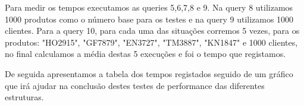\begin{verbatim}

\end{verbatim}

\par Para medir os tempos executamos as queries 5,6,7,8 e 9. Na query 8 utilizamos 1000 produtos como o número base
para os testes e na query 9 utilizamos 1000 clientes. Para a query 10, para cada uma das situações corremos 5 vezes,
para os produtos: "HO2915", "GF7879", "EN3727", "TM3887", "KN1847" e 1000 clientes, no final calculamos a média destas 5
execuções e foi o tempo que registamos.
\par De seguida apresentamos a tabela dos tempos registados seguido de um gráfico que irá ajudar na conclusão destes
testes de performance das diferentes estruturas.


  	
